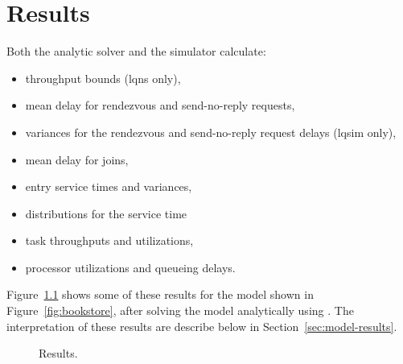 
\chapter{Results}
\label{sec:results}

Both the analytic solver and the simulator calculate:
\begin{itemize}
\item throughput bounds (lqns only),
\item mean delay for rendezvous and
  send-no-reply requests,
\item variances for the rendezvous and send-no-reply request delays
  (lqsim only),
\item mean delay for joins,
\item entry service times and variances,
\item distributions for the service time
\item task throughputs and
  utilizations,
\item processor utilizations  and
  queueing delays.
\end{itemize}
Figure~\ref{fig:results} shows some of these results for the model
shown in Figure~\ref{fig:bookstore}, after solving the model
analytically using .  The interpretation of these
results are describe below in Section~\ref{sec:model-results}.

\begin{figure}[htbp]
  \centering
  \caption{Results.}
  \label{fig:results}
\end{figure}

